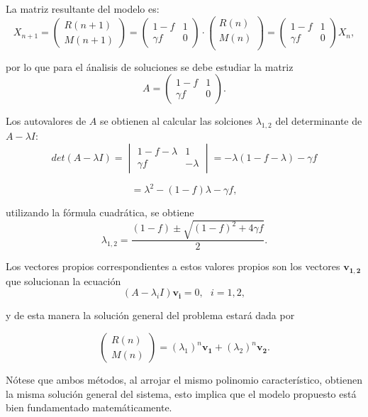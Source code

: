 La matriz resultante del modelo es:
$$X_{n+1}=\begin{pmatrix}
    R(n+1) \\
    M(n+1) 
    \end{pmatrix}=
    \begin{pmatrix}
    1-f & 1\\
    \gamma f & 0 
    \end{pmatrix} \cdot 
    \begin{pmatrix}
    R(n) \\
    M(n) \\
    \end{pmatrix}=
    \begin{pmatrix}
        1-f & 1\\
        \gamma f & 0 
        \end{pmatrix} X_n,$$

por lo que para el ánalisis de soluciones se debe estudiar la matriz
$$A=\begin{pmatrix}
    1-f & 1\\
    \gamma f & 0 
    \end{pmatrix}.$$

Los autovalores de $A$ se obtienen al calcular las solciones $\lambda_{1,2}$ del determinante de $A-\lambda I$:
$$det(A-\lambda I) = \begin{vmatrix}
    1-f-\lambda & 1\\
    \gamma f & -\lambda 
    \end{vmatrix} = -\lambda(1-f-\lambda)-\gamma f$$

$$=\lambda^2-(1-f)\lambda-\gamma f,$$

utilizando la fórmula cuadrática, se obtiene
$$\lambda_{1,2}=\dfrac{(1-f)\pm\sqrt{(1-f)^2+4\gamma f}}{2}.$$

Los vectores propios correspondientes a estos valores propios son los vectores $\mathbf{v_{1,2}}$ que solucionan la ecuación
$$(A-\lambda_i I)\mathbf{v_i}=0, \:\:\: i=1,2,$$

y de esta manera la solución general del problema estará dada por

$$\begin{pmatrix}
    R(n) \\
    M(n) 
    \end{pmatrix}= (\lambda_1)^n \mathbf{v_1}+(\lambda_2)^n \mathbf{v_2}.$$


Nótese que ambos métodos, al arrojar el mismo polinomio característico, obtienen la misma solución general del sistema, esto implica que el modelo propuesto está bien fundamentado matemáticamente.

